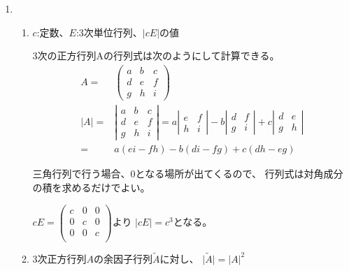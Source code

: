 \documentclass[10pt,b5paper]{ltjsarticle}
\begin{document}
\begin{enumerate}
 \item 
       \begin{enumerate}
        \item $c$:定数、$E$:3次単位行列、$\lvert cE \rvert$の値
              
              3次の正方行列Aの行列式は次のようにして計算できる。
              \begin{align}
               A =& \left(
                 \begin{matrix}a & b & c\\ d & e & f \\ g & h & i\end{matrix}
               \right)\\
               \lvert A \rvert =& \left|
               \begin{matrix}a & b & c\\ d & e & f \\ g & h & i\end{matrix} \right| 
                         = a\left|\begin{matrix}e & f \\h & i\end{matrix} \right|
                        - b\left|\begin{matrix}d & f \\g & i\end{matrix} \right|
                        + c\left|\begin{matrix}d & e \\g & h\end{matrix} \right|\\
               =& a(ei-fh)-b(di-fg)+c(dh-eg)
              \end{align}

              三角行列で行う場合、$0$となる場所が出てくるので、
              行列式は対角成分の積を求めるだけでよい。

                        $cE=\left(\begin{matrix}c&0&0\\0&c&0\\0&0&c\\\end{matrix}\right)$より
              $\lvert cE \rvert = c^3$となる。

        \item 3次正方行列$A$の余因子行列$\tilde{A}$に対し、
              $\lvert \tilde{A} \rvert =\lvert A \rvert^2$


\end{enumerate}
\end{enumerate}
\end{document}
